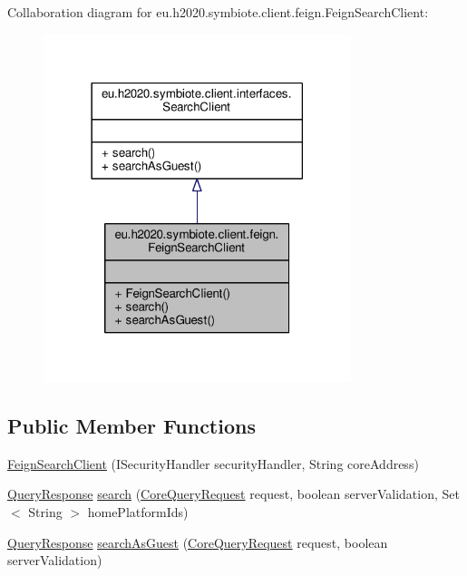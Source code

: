 Collaboration diagram for eu.\+h2020.\+symbiote.\+client.\+feign.\+Feign\+Search\+Client\+:
\nopagebreak
\begin{figure}[H]
\begin{center}
\leavevmode
\includegraphics[width=254pt]{classeu_1_1h2020_1_1symbiote_1_1client_1_1feign_1_1FeignSearchClient__coll__graph}
\end{center}
\end{figure}
\subsection*{Public Member Functions}
\begin{DoxyCompactItemize}
\item 
\hyperlink{classeu_1_1h2020_1_1symbiote_1_1client_1_1feign_1_1FeignSearchClient_a661c390234d0f283a661e93d28ccc4d7}{Feign\+Search\+Client} (I\+Security\+Handler security\+Handler, String core\+Address)
\item 
\hyperlink{classeu_1_1h2020_1_1symbiote_1_1core_1_1ci_1_1QueryResponse}{Query\+Response} \hyperlink{classeu_1_1h2020_1_1symbiote_1_1client_1_1feign_1_1FeignSearchClient_a7ab11d6bbb16fb2dedb4c1deb13d0499}{search} (\hyperlink{classeu_1_1h2020_1_1symbiote_1_1core_1_1internal_1_1CoreQueryRequest}{Core\+Query\+Request} request, boolean server\+Validation, Set$<$ String $>$ home\+Platform\+Ids)
\item 
\hyperlink{classeu_1_1h2020_1_1symbiote_1_1core_1_1ci_1_1QueryResponse}{Query\+Response} \hyperlink{classeu_1_1h2020_1_1symbiote_1_1client_1_1feign_1_1FeignSearchClient_ae3379566327dc89bae6fb25cfafc68da}{search\+As\+Guest} (\hyperlink{classeu_1_1h2020_1_1symbiote_1_1core_1_1internal_1_1CoreQueryRequest}{Core\+Query\+Request} request, boolean server\+Validation)
\end{DoxyCompactItemize}


